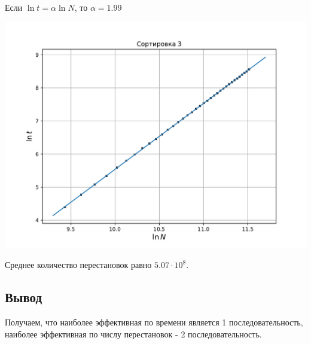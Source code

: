 \documentclass[a4paper,12pt]{article}
\begin{document}
Если $\ln t = \alpha \ln N$, то $\alpha = 1.99$


\begin{center}
\includegraphics[scale=0.6]{Figure_4.pdf}
\end{center}

Среднее количество перестановок равно $5.07 \cdot 10^8$.

\subsection*{Вывод}
Получаем, что наиболее эффективная по времени является 1 последовательность, наиболее эффективная по числу перестановок - 2 последовательность.
\end{document}

